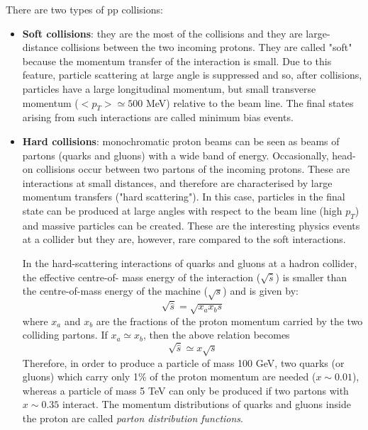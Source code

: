 \documentclass[a4paper, oneside]{book}
\begin{document}
					There are two types of pp collisions:
					\begin{itemize}
						\item \textbf{Soft collisions}: 
						they are the most of the collisions and they are large-distance collisions between the two incoming protons. They are called "soft" because the momentum transfer of the interaction is small. Due to this feature, particle scattering at large angle is suppressed and so, after collisions, particles have a large longitudinal momentum, but small transverse momentum ($<p_T>\simeq500$ MeV) relative to the beam line. The final states
						arising from such interactions are called minimum bias events.
						\item \textbf{Hard collisions}:
						monochromatic proton beams can be seen as beams of partons (quarks and gluons) with a wide band
						of energy. Occasionally, head-on collisions occur between two partons of the incoming protons. These are interactions at small distances, and therefore are characterised by large
						momentum transfers ("hard scattering"). In this case, particles in the final state can be produced at large angles with respect to the beam line (high $p_T$) and massive particles can be created.
						These are the interesting physics events at a collider but they are, however, rare compared to the soft interactions.
						
						In the hard-scattering interactions of quarks and gluons at a hadron collider, the effective centre-of-
						mass energy of the interaction ($\sqrt{\hat{s}}$) is smaller than the centre-of-mass energy of the machine ($\sqrt{s}$) and is given by: 
						$$ 
						\sqrt{\hat{s}} = \sqrt{x_ax_bs}
						$$
						where $x_a$ and $x_b$ are the fractions of the proton momentum carried by the two colliding partons. If $x_a \simeq x_b$, then the above relation becomes
						$$ 
						\sqrt{\hat{s}} \simeq x\sqrt{s}
						$$
						Therefore, in order to produce a particle of mass 100 GeV, two quarks (or gluons) which carry only 1\% of the proton momentum are needed ($x \sim 0.01$), whereas a particle of mass 5 TeV can only be produced if two partons with $x \sim 0.35$ interact. The momentum distributions of quarks and gluons inside the proton are called \textit{parton distribution functions}. %
			\end{itemize}
\end{document}
